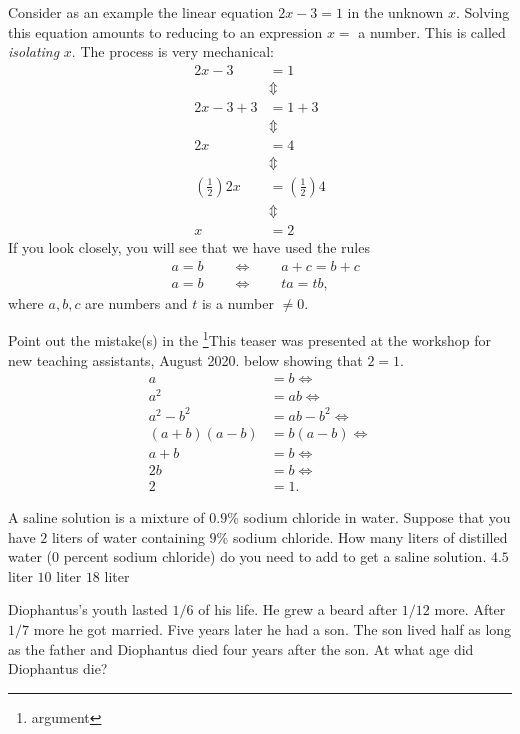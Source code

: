 \documentclass{article}
\begin{document}
Consider as an example the linear equation $2 x - 3 = 1$ in the unknown $x$.
Solving this equation amounts to reducing to an expression $x=$ a number. This
is called \emph{isolating} $x$. The process is very mechanical:
\begin{align*}
2 x - 3 &= 1\\
&\Updownarrow\\
2 x - 3 + 3 &= 1 + 3\\
&\Updownarrow\\
2 x &= 4\\
&\Updownarrow\\
\left(\frac{1}{2}\right) 2 x &= \left(\frac{1}{2}\right) 4\\ 
&\Updownarrow\\
x &= 2
\end{align*}
If you look closely, you will see that we have used the rules
\begin{align*}
&a=b\qquad \iff \qquad a + c = b + c\\
&a=b\qquad \iff \qquad t a = t b,
\end{align*}
where $a, b, c$ are numbers and $t$ is a number $\neq 0$.

\beginshex
Point out the mistake(s) in the \footnote{argument}{This teaser was presented at the workshop for new teaching assistants, August 2020.} below showing that $2 = 1$.
\begin{align*}
  a &= b \iff \\
  a^2 &= a b \iff\\
  a^2 - b^2 &= a b - b^2 \iff \\
  (a + b)(a - b) &= b (a - b) \iff\\
  a + b &= b \iff \\
  2 b &= b \iff \\
  2 &= 1.
\end{align*}
\endshex

\begin{quizexercise}[showhide]
\begin{quiz}
\question
A saline solution is a mixture of $0.9$\% sodium chloride in water. Suppose that you have
$2$ liters of water containing $9$\% sodium chloride. How many liters of
distilled water ($0$ percent sodium chloride)
do you need to add to get a saline solution.
$4.5$ liter
$10$ liter
$18$ liter
\end{quiz}
\end{quizexercise}

\beginshex
Diophantus's youth lasted $1/6$ of his life. He grew a beard after $1/12$ more. After $1/7$ more
he got married. Five years later he had a son. The son lived half as long as the father
and Diophantus died four years after the son. At what age did Diophantus die?
\end{document}
